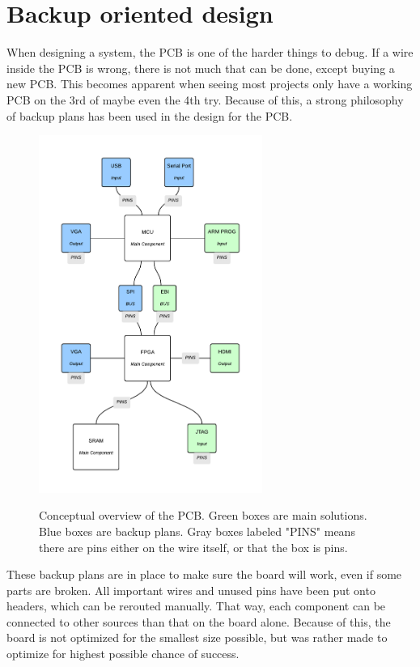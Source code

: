 \documentclass[../main/report.tex]{subfiles}
\begin{document}
\section{Backup oriented design}

When designing a system, the PCB is one of the harder things to debug.
If a wire inside the PCB is wrong, there is not much that can be done, except buying a new PCB.
This becomes apparent when seeing most projects only have a working PCB on the 3rd of maybe even the 4th try. 
Because of this, a strong philosophy of backup plans has been used in the design for the PCB.

\begin{figure}[H]
    \centering
    \includegraphics[width=0.65\textwidth]{../pcb/assets/pcb-overview.pdf}
    \label{fig:pcb-overview}
    \caption{Conceptual overview of the PCB. Green boxes are main solutions. Blue boxes are backup plans.
             Gray boxes labeled "PINS" means there are pins either on the wire itself, or that the box is pins.}
\end{figure}

These backup plans are in place to make sure the board will work, even if some parts are broken.
All important wires and unused pins have been put onto headers, which can be rerouted manually.
That way, each component can be connected to other sources than that on the board alone.
Because of this, the board is not optimized for the smallest size possible, but was rather made to optimize for highest possible chance of success.
\end{document}
